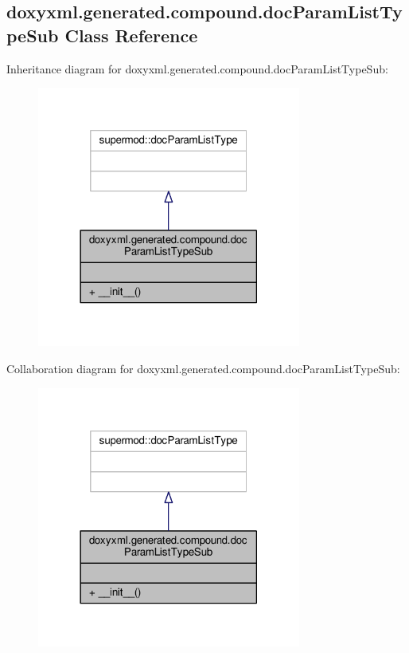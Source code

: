 \subsection{doxyxml.\+generated.\+compound.\+doc\+Param\+List\+Type\+Sub Class Reference}
\label{classdoxyxml_1_1generated_1_1compound_1_1docParamListTypeSub}


Inheritance diagram for doxyxml.\+generated.\+compound.\+doc\+Param\+List\+Type\+Sub\+:
\nopagebreak
\begin{figure}[H]
\begin{center}
\leavevmode
\includegraphics[width=246pt]{dd/d2f/classdoxyxml_1_1generated_1_1compound_1_1docParamListTypeSub__inherit__graph}
\end{center}
\end{figure}


Collaboration diagram for doxyxml.\+generated.\+compound.\+doc\+Param\+List\+Type\+Sub\+:
\nopagebreak
\begin{figure}[H]
\begin{center}
\leavevmode
\includegraphics[width=246pt]{d2/d0c/classdoxyxml_1_1generated_1_1compound_1_1docParamListTypeSub__coll__graph}
\end{center}
\end{figure}
